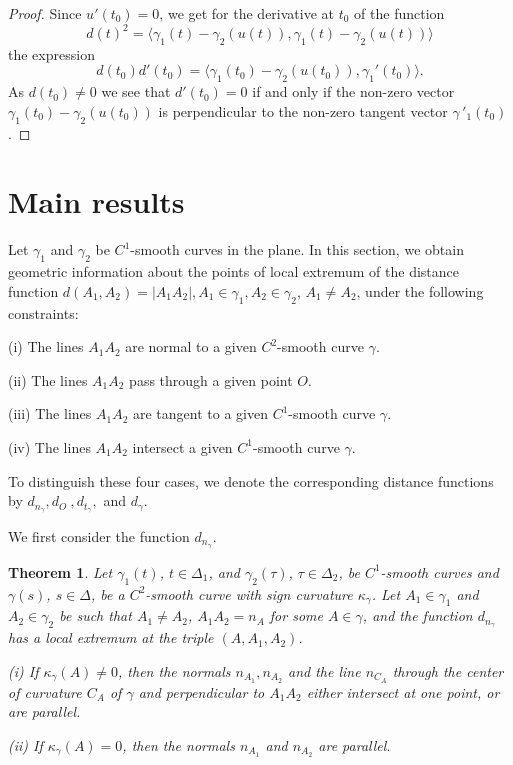 \documentclass[a4paper,12pt]{amsart}
\newtheorem{thm}{Theorem}
\def\g{\gamma}
\begin{document}
\begin{proof} Since $u'(t_0) =0$, we get for the derivative  at $t_0$ of the function
$$d(t)^2 = \langle \g_1(t) - \g_2(u(t)), \g_1(t) - \g_2(u(t))\rangle$$
the expression
$$ d(t_0) d'(t_0) = \langle \g_1(t_0) - \g_2(u(t_0)), \g_1'(t_0) \rangle.$$
As $d(t_0) \neq 0$ we see that
 $d'(t_0)=0$ if and only if the non-zero vector
 $\g_1(t_0) - \g_2(u(t_0))$ is perpendicular to the non-zero tangent vector $\g\,'_1(t_0)$.
\end{proof}



\section{Main results}\label{mr}

Let $\g_1$ and $\g_2$ be $C^1$-smooth curves in the plane.
In this section, we obtain geometric information about the points of local extremum of the distance function
$d(A_1,A_2)=|A_1A_2| , A_1\in \g_1 , A_2\in \g_2$, $A_1 \neq A_2$, under the following constraints:

(i) The lines $A_1A_2$ are normal to a given $C^2$-smooth curve $\g$.

(ii) The lines $A_1A_2$ pass through a given point $O$.

(iii) The lines $A_1A_2$ are tangent to a given $C^1$-smooth curve $\g$.

(iv) The lines $A_1A_2$ intersect a given $C^1$-smooth curve $\g$.

To distinguish these four cases, we denote the corresponding
distance functions by $d_{n_{\g}}, d_O \ , d_{t_{\g}}, $ and
$d_{\g}$.

We first consider the function $d_{n_{\g}}$.

\begin{thm}\label{A} Let $\g_1(t)$,
$t\in \Delta_1$, and $ \g_2(\tau)$,
$\tau \in \Delta_2$,  be $C^1$-smooth curves
and $\g(s)$, $s \in \Delta$, be a $C^2$-smooth curve with sign curvature
$\kappa_{\g}$. Let $A_1\in \g_1$ and $A_2\in \g_2$ be such that
$A_1\neq A_2$, $A_1A_2=n_A$ for some $A \in \g$, and the function $d_{n_{\g}}$ has a local extremum at the triple $(A, A_1,A_2)$.


(i) If $\kappa_{\g}(A)\neq 0$, then the normals $n_{A_1} ,
n_{A_2}$ and the line $n_{C_A}$ through the center of curvature
$C_A$ of $\g$ and perpendicular to $A_1A_2$ either intersect at
one point, or are parallel.

(ii) If $\kappa_{\g}(A)= 0$, then the normals $n_{A_1}$ and
$n_{A_2}$ are parallel.
\end{thm}
\end{document}
